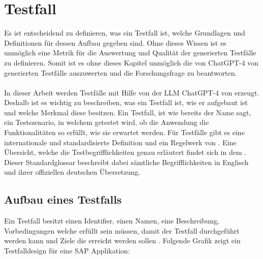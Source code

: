 \documentclass[12pt,toc=bib,toc=listof]{scrreprt}
\begin{document}
\section{Testfall} %
\label{sec:testfall}
Es ist entscheidend zu definieren, was ein Testfall ist, welche Grundlagen und Definitionen für dessen Aufbau gegeben sind. Ohne dieses Wissen ist es unmöglich eine Metrik für die Auswertung und Qualität der generierten Testfälle zu definieren. Somit ist es ohne dieses Kapitel unmöglich die von ChatGPT-4 von \textcite{OpenAI2025} generierten Testfälle auszuwerten und die Forschungsfrage zu beantworten.\\
\\
In dieser Arbeit werden Testfälle mit Hilfe von der LLM ChatGPT-4 von \textcite{OpenAI2025} erzeugt. Deshalb ist es wichtig zu beschreiben, was ein Testfall ist, wie er aufgebaut ist und welche Merkmal diese besitzen. Ein Testfall, ist wie bereits der Name sagt, ein Testszenario, in welchem getestet wird, ob die Anwendung die Funktionalitäten so erfüllt, wie sie erwartet werden. Für Testfälle gibt es eine internationale und standardisierte Definition und ein Regelwerk von \textcite{IsoIecIeee2024}. Eine Übersicht, welche die Testbegrifflichkeiten genau erläutert findet sich in dem \textcite{Istqb2017}. Dieser Standardglossar beschreibt dabei sämtliche Begrifflichkeiten in Englisch und ihrer offiziellen deutschen Übersetzung.
\newpage

\subsection{Aufbau eines Testfalls} %
\label{sec:aufbauEinesTestfalls}
Ein Testfall besitzt einen Identifier, einen Namen, eine Beschreibung, Vorbedingungen welche erfüllt sein müssen, damit der Testfall durchgeführt werden kann und Ziele die erreicht werden sollen \textcite{IsoIecIeee2024}. Folgende Grafik zeigt ein Testfalldesign für eine SAP Applikation:
\end{document}
